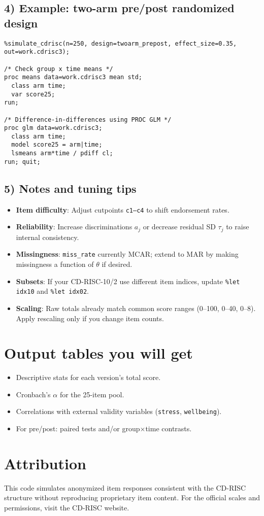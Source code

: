 \documentclass[12pt]{article}
\begin{document}
\subsection*{4) Example: two-arm pre/post randomized design}
\begin{lstlisting}
%simulate_cdrisc(n=250, design=twoarm_prepost, effect_size=0.35, out=work.cdrisc3);

/* Check group x time means */
proc means data=work.cdrisc3 mean std;
  class arm time;
  var score25;
run;

/* Difference-in-differences using PROC GLM */
proc glm data=work.cdrisc3;
  class arm time;
  model score25 = arm|time;
  lsmeans arm*time / pdiff cl;
run; quit;
\end{lstlisting}

\subsection*{5) Notes and tuning tips}
\begin{itemize}
  \item \textbf{Item difficulty}: Adjust cutpoints \texttt{c1--c4} to shift endorsement rates.
  \item \textbf{Reliability}: Increase discriminations \(a_j\) or decrease residual SD \( \tau_j\) to raise internal consistency.
  \item \textbf{Missingness}: \texttt{miss\_rate} currently MCAR; extend to MAR by making missingness a function of \(\theta\) if desired.
  \item \textbf{Subsets}: If your CD-RISC-10/2 use different item indices, update \texttt{\%let idx10} and \texttt{\%let idx02}.
  \item \textbf{Scaling}: Raw totals already match common score ranges (0--100, 0--40, 0--8). Apply rescaling only if you change item counts.
\end{itemize}

\section*{Output tables you will get}
\begin{itemize}
  \item Descriptive stats for each version's total score.
  \item Cronbach's $\alpha$ for the 25-item pool.
  \item Correlations with external validity variables (\texttt{stress}, \texttt{wellbeing}).
  \item For pre/post: paired tests and/or group$\times$time contrasts.
\end{itemize}

\section*{Attribution}
This code simulates anonymized item responses consistent with the CD-RISC structure without reproducing proprietary item content. For the official scales and permissions, visit the CD-RISC website.
\end{document}
